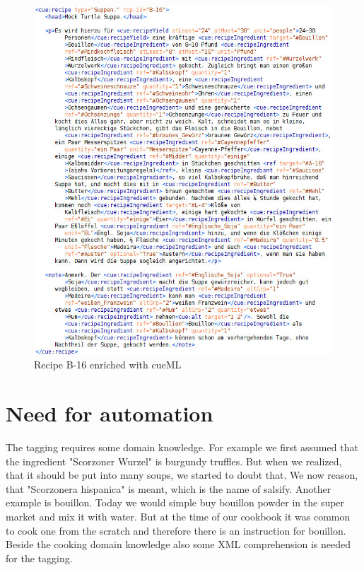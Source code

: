 \documentclass[12pt, twoside]{report}
\begin{document}
\newpage
\begin{figure}[H]
	\centering
	\includegraphics[width=1\textwidth]{Images/B-16-enriched}
	\caption{Recipe B-16 enriched with cueML}
	\label{fig:B16Enriched}
\end{figure}
\newpage



\section{Need for automation}\label{sec:NeedForAutomation}
The tagging requires some domain knowledge. For example we first assumed that the ingredient "Scorzoner Wurzel" is burgundy truffles. But when we realized, that it should be put into many soups, we started to doubt that. We now reason, that "Scorzonera hispanica" is meant, which is the name of salsify. Another example is bouillon. Today we would simple buy bouillon powder in the super market and mix it with water. But at the time of our cookbook it was common to cook one from the scratch and therefore there is an instruction for bouillon. Beside the cooking domain knowledge also some XML comprehension is needed for the tagging.
\end{document}
